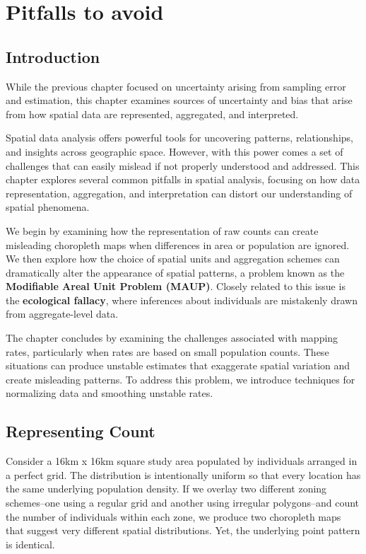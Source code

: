 \documentclass[
  letterpaper,
]{book}
\begin{document}
\chapter{Pitfalls to avoid}\label{pitfalls-to-avoid}

\section{Introduction}\label{introduction-5}

While the previous chapter focused on uncertainty arising from sampling
error and estimation, this chapter examines sources of uncertainty and
bias that arise from how spatial data are represented, aggregated, and
interpreted.

Spatial data analysis offers powerful tools for uncovering patterns,
relationships, and insights across geographic space. However, with this
power comes a set of challenges that can easily mislead if not properly
understood and addressed. This chapter explores several common pitfalls
in spatial analysis, focusing on how data representation, aggregation,
and interpretation can distort our understanding of spatial phenomena.

We begin by examining how the representation of raw counts can create
misleading choropleth maps when differences in area or population are
ignored. We then explore how the choice of spatial units and aggregation
schemes can dramatically alter the appearance of spatial patterns, a
problem known as the \textbf{Modifiable Areal Unit Problem (MAUP)}.
Closely related to this issue is the \textbf{ecological fallacy}, where
inferences about individuals are mistakenly drawn from aggregate-level
data.

The chapter concludes by examining the challenges associated with
mapping rates, particularly when rates are based on small population
counts. These situations can produce unstable estimates that exaggerate
spatial variation and create misleading patterns. To address this
problem, we introduce techniques for normalizing data and smoothing
unstable rates.

\section{Representing Count}\label{representing-count}

Consider a 16km x 16km square study area populated by individuals
arranged in a perfect grid. The distribution is intentionally uniform so
that every location has the same underlying population density. If we
overlay two different zoning schemes--one using a regular grid and
another using irregular polygons--and count the number of individuals
within each zone, we produce two choropleth maps that suggest very
different spatial distributions. Yet, the underlying point pattern is
identical.
\end{document}
